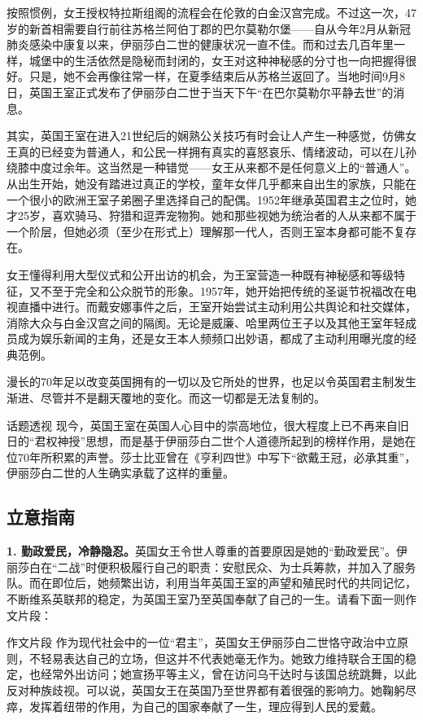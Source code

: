 按照惯例，女王授权特拉斯组阁的流程会在伦敦的白金汉宫完成。不过这一次，47岁的新首相需要自行前往苏格兰阿伯丁郡的巴尔莫勒尔堡——自从今年2月从新冠肺炎感染中康复以来，伊丽莎白二世的健康状况一直不佳。而和过去几百年里一样，城堡中的生活依然是隐秘而封闭的，女王对这种神秘感的分寸也一向把握得很好。只是，她不会再像往常一样，在夏季结束后从苏格兰返回了。当地时间9月8日，英国王室正式发布了伊丽莎白二世于当天下午“在巴尔莫勒尔平静去世”的消息。

其实，英国王室在进入21世纪后的娴熟公关技巧有时会让人产生一种感觉，仿佛女王真的已经变为普通人，和公民一样拥有真实的喜怒哀乐、情绪波动，可以在儿孙绕膝中度过余年。这当然是一种错觉——女王从来都不是任何意义上的“普通人”。从出生开始，她没有踏进过真正的学校，童年女伴几乎都来自出生的家族，只能在一个很小的欧洲王室子弟圈子里选择自己的配偶。1952年继承英国君主之位时，她才25岁，喜欢骑马、狩猎和逗弄宠物狗。她和那些视她为统治者的人从来都不属于一个阶层，但她必须（至少在形式上）理解那一代人，否则王室本身都可能不复存在。

女王懂得利用大型仪式和公开出访的机会，为王室营造一种既有神秘感和等级特征，又不至于完全和公众脱节的形象。1957年，她开始把传统的圣诞节祝福改在电视直播中进行。而戴安娜事件之后，王室开始尝试主动利用公共舆论和社交媒体，消除大众与白金汉宫之间的隔阂。无论是威廉、哈里两位王子以及其他王室年轻成员成为娱乐新闻的主角，还是女王本人频频口出妙语，都成了主动利用曝光度的经典范例。

漫长的70年足以改变英国拥有的一切以及它所处的世界，也足以令英国君主制发生渐进、尽管并不是翻天覆地的变化。而这一切都是无法复制的。

\begin{quoteBox}{话题透视}
现今，英国王室在英国人心目中的崇高地位，很大程度上已不再来自旧日的“君权神授”思想，而是基于伊丽莎白二世个人道德所起到的榜样作用，是她在位70年所积累的声誉。莎士比亚曾在《亨利四世》中写下“欲戴王冠，必承其重”，伊丽莎白二世的人生确实承载了这样的重量。
\end{quoteBox}

\subsection*{立意指南}

\textbf{1. 勤政爱民，冷静隐忍。}英国女王令世人尊重的首要原因是她的“勤政爱民”。伊丽莎白在“二战”时便积极履行自己的职责：安慰民众、为士兵筹款，并加入了服务队。而在即位后，她频繁出访，利用当年英国王室的声望和殖民时代的共同记忆，不断维系英联邦的稳定，为英国王室乃至英国奉献了自己的一生。请看下面一则作文片段：

\begin{quoteBox}{作文片段}
作为现代社会中的一位“君主”，英国女王伊丽莎白二世恪守政治中立原则，不轻易表达自己的立场，但这并不代表她毫无作为。她致力维持联合王国的稳定，也经常外出访问；她宣扬平等主义，曾在访问乌干达时与该国总统跳舞，以此反对种族歧视。可以说，英国女王在英国乃至世界都有着很强的影响力。她鞠躬尽瘁，发挥着纽带的作用，为自己的国家奉献了一生，理应得到人民的爱戴。
\end{quoteBox}

